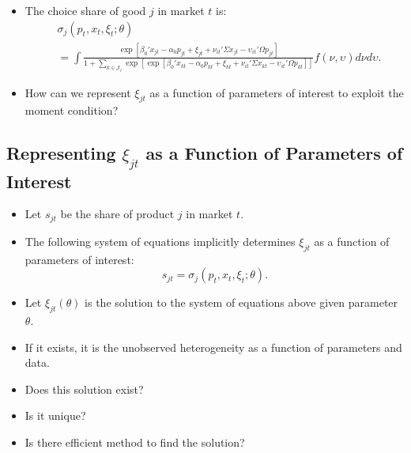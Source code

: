 \documentclass[
]{book}
\providecommand{\tightlist}{%
  \setlength{\itemsep}{0pt}\setlength{\parskip}{0pt}}
\begin{document}
\begin{itemize}
\tightlist
\item
  The choice share of good \(j\) in market \(t\) is:
  \begin{equation}
  \begin{split}
  &\sigma_{j}(p_t, x_t, \xi_t; \theta)\\
  &= \int \frac{\exp[\beta_0' x_{jt} - \alpha_0 p_{jt} + \xi_{jt} + \nu_{it}' \Sigma x_{jt} - \upsilon_{it}' \Omega p_{jt}]}{1 + \sum_{k \in \mathcal{J}_t} \exp[\exp[\beta_0' x_{kt} - \alpha_0 p_{kt} + \xi_{kt} + \nu_{it}' \Sigma x_{kt} - \upsilon_{it}' \Omega p_{kt}]]} f(\nu, \upsilon) d \nu d \upsilon.
  \end{split}
  \end{equation}
\item
  How can we represent \(\xi_{jt}\) as a function of parameters of interest to exploit the moment condition?
\end{itemize}

\hypertarget{representing-xi_jt-as-a-function-of-parameters-of-interest}{%
\subsection{\texorpdfstring{Representing \(\xi_{jt}\) as a Function of Parameters of Interest}{Representing \textbackslash xi\_\{jt\} as a Function of Parameters of Interest}}\label{representing-xi_jt-as-a-function-of-parameters-of-interest}}

\begin{itemize}
\tightlist
\item
  Let \(s_{jt}\) be the share of product \(j\) in market \(t\).
\item
  The following system of equations implicitly determines \(\xi_{jt}\) as a function of parameters of interest:
  \begin{equation}
  s_{jt} = \sigma_j(p_t, x_t, \xi_t; \theta).
  \end{equation}
\item
  Let \(\xi_{jt}(\theta)\) is the solution to the system of equations above given parameter \(\theta\).
\item
  If it exists, it is the unobserved heterogeneity as a function of parameters and data.
\item
  Does this solution exist?
\item
  Is it unique?
\item
  Is there efficient method to find the solution?
\end{itemize}
\end{document}
